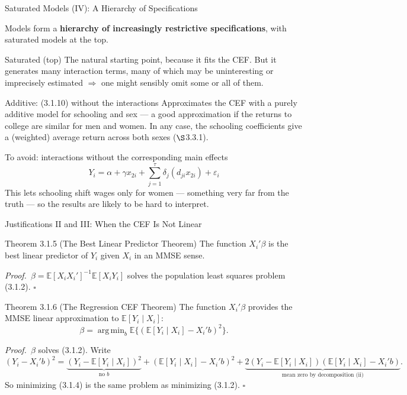 \documentclass[aspectratio=169,11pt]{beamer}
\newcommand{\E}{\mathbb{E}}
\DeclareMathOperator*{\argmin}{arg\,min}
\newcommand{\PrfLbl}{\textcolor{DeepBlue}{\textit{Proof.}}\ }
\newcommand{\QED}{\hfill$\square$}
\newcommand{\Sec}{\ensuremath{\S}}
\begin{document}
\begin{frame}{Saturated Models (IV): A Hierarchy of Specifications}
\small

Models form a \textbf{hierarchy of increasingly restrictive specifications},
with saturated models at the top.

\medskip

\begin{block}{Saturated (top)}
The natural starting point, because it fits the CEF. But it generates many
interaction terms, many of which may be uninteresting or imprecisely
estimated $\Rightarrow$ one might sensibly omit some or all of them.
\end{block}

\begin{block}{Additive: (3.1.10) without the interactions}
Approximates the CEF with a purely additive model for schooling and sex ---
a good approximation if the returns to college are similar for men and
women. In any case, the schooling coefficients give a (weighted) average
return across both sexes (\Sec{}3.3.1).
\end{block}

\begin{alertblock}{To avoid: interactions without the corresponding main effects}
\[
Y_i = \alpha+\gamma x_{2i}+\sum_{j=1}^{\tau}\delta_j(d_{ji}x_{2i})+\varepsilon_i
\tag{3.1.11}
\]
This lets schooling shift wages only for women --- something very far from
the truth --- so the results are likely to be hard to interpret.
\end{alertblock}

\end{frame}


\begin{frame}{Justifications II and III: When the CEF Is Not Linear}
\small

\begin{block}{Theorem 3.1.5 (The Best Linear Predictor Theorem)}
The function $X_i'\beta$ is the best linear predictor of $Y_i$ given $X_i$
in an MMSE sense.
\end{block}
\PrfLbl $\beta=\E[X_iX_i']^{-1}\E[X_iY_i]$ solves the population least
squares problem (3.1.2). \QED

\medskip

\begin{block}{Theorem 3.1.6 (The Regression CEF Theorem)}
The function $X_i'\beta$ provides the MMSE linear approximation to
$\E[Y_i\mid X_i]$:
\[
\beta = \argmin_b \E\big\{(\E[Y_i\mid X_i]-X_i'b)^2\big\}.
\tag{3.1.4}
\]
\end{block}
\PrfLbl $\beta$ solves (3.1.2). Write
\[
(Y_i-X_i'b)^2
= \underbrace{(Y_i-\E[Y_i\mid X_i])^2}_{\text{no } b}
+ (\E[Y_i\mid X_i]-X_i'b)^2
+ \underbrace{2(Y_i-\E[Y_i\mid X_i])(\E[Y_i\mid X_i]-X_i'b)}_{\text{mean zero by decomposition (ii)}}.
\]
So minimizing (3.1.4) is the same problem as minimizing (3.1.2). \QED

\end{frame}
\end{document}
